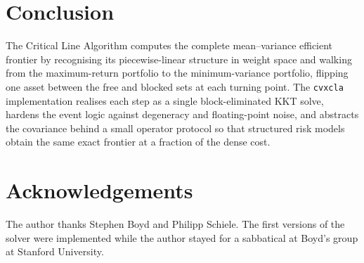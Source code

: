\documentclass[11pt]{article}
\begin{document}
\section{Conclusion}

The Critical Line Algorithm computes the complete mean--variance efficient frontier by
recognising its piecewise-linear structure in weight space and walking from the
maximum-return portfolio to the minimum-variance portfolio, flipping one asset between
the free and blocked sets at each turning point. The \texttt{cvxcla} implementation
realises each step as a single block-eliminated KKT solve, hardens the event logic
against degeneracy and floating-point noise, and abstracts the covariance behind a
small operator protocol so that structured risk models obtain the same exact frontier
at a fraction of the dense cost.

\section*{Acknowledgements}

The author thanks Stephen Boyd and Philipp Schiele. The first versions of the
solver were implemented while the author stayed for a sabbatical at Boyd's group
at Stanford University.
\end{document}
